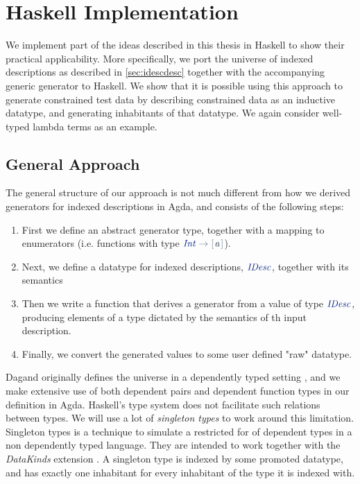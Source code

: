 \documentclass[a4paper,msc,twosized=semi]{uustthesis}
\newcommand*{\mathcolor}{}
\def\mathcolor#1#{\mathcoloraux{#1}}
\newcommand*{\mathcoloraux}[3]{%
  \protect\leavevmode
  \begingroup
    \color#1{#2}#3%
  \endgroup
}
\newcommand{\HSSpecial}[1]{\mathcolor{hsblue4}{#1}}
\newcommand{\HSSym}[1]{\mathcolor{hsblue4}{#1}}
\newcommand{\HSCon}[1]{\mathcolor{hsblue3}{\mathit{#1}}}
\newcommand{\HSVar}[1]{\mathcolor{hsblue5}{\mathit{#1}}}
\begin{document}

\chapter{Haskell Implementation}
We implement part of the ideas described in this thesis in Haskell to show their practical applicability. More specifically, we port the universe of indexed descriptions as described in \cref{sec:idescdesc} together with the accompanying generic generator to Haskell. We show that it is possible using this approach to generate constrained test data by describing constrained data as an inductive datatype, and generating inhabitants of that datatype. We again consider well-typed lambda terms as an example. 

\section{General Approach}

  The general structure of our approach is not much different from how we derived generators for indexed descriptions in Agda, and consists of the following steps: 

  \begin{enumerate}
    \item 
      First we define an abstract generator type, together with a mapping to enumerators (i.e. functions with type \ensuremath{\HSCon{Int}\HSSym{\to} \HSSpecial{\HSSym{[\mskip1.5mu} }\HSVar{a}\HSSpecial{\HSSym{\mskip1.5mu]}}}). 

    \item 
      Next, we define a datatype for indexed descriptions, \ensuremath{\HSCon{IDesc}}, together with its semantics

    \item 
      Then we write a function that derives a generator from a value of type \ensuremath{\HSCon{IDesc}}, producing elements of a type dictated by the semantics of th input description. 

    \item 
      Finally, we convert the generated values to some user defined "raw" datatype.  
  \end{enumerate}

Dagand originally defines the universe in a dependently typed setting \cite{dagand2013cosmology}, and we make extensive use of both dependent pairs and dependent function types in our definition in Agda. Haskell's type system does not facilitate such relations between types. We will use a lot of \emph{singleton types} \cite{eisenberg2013dependently} to work around this limitation. Singleton types is a technique to simulate a restricted for of dependent types in a non dependently typed language. They are intended to work together with the \emph{DataKinds} extension \cite{ghcdocsdatakinds}. A singleton type is indexed by some promoted datatype, and has exactly one inhabitant for every inhabitant of the type it is indexed with.   
\end{document}
